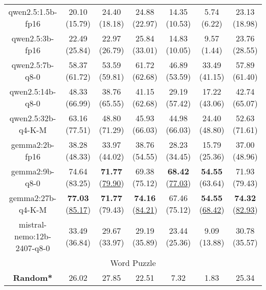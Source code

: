 \begin{table}[hbp]
{\begin{tabular}{ccccccc}
      \multicolumn{1}{c|}{qwen2.5:1.5b-fp16} & 20.10 (15.79) & 24.40 (18.18) & \multicolumn{1}{c|}{24.88 (22.97)} & 14.35 (10.53) & \multicolumn{1}{c|}{5.74 (6.22)} & 23.13 (18.98) \\


      \multicolumn{1}{c|}{qwen2.5:3b-fp16} & 22.49 (25.84) & 22.97 (26.79) & \multicolumn{1}{c|}{25.84 (33.01)} & 14.83 (10.05) & \multicolumn{1}{c|}{9.57 (1.44)} & 23.76 (28.55) \\


      \multicolumn{1}{c|}{qwen2.5:7b-q8-0} & 58.37 (61.72) & 53.59 (59.81) & \multicolumn{1}{c|}{61.72 (62.68)} & 46.89 (53.59) & \multicolumn{1}{c|}{33.49 (41.15)} & 57.89 (61.40) \\


      \multicolumn{1}{c|}{qwen2.5:14b-q8-0} & 48.33 (66.99) & 38.76 (65.55) & \multicolumn{1}{c|}{41.15 (62.68)} & 29.19 (57.42) & \multicolumn{1}{c|}{17.22 (43.06)} & 42.74 (65.07) \\


      \multicolumn{1}{c|}{qwen2.5:32b-q4-K-M} & 63.16 (77.51) & 48.80 (71.29) & \multicolumn{1}{c|}{45.93 (66.03)} & 44.98 (66.03) & \multicolumn{1}{c|}{24.40 (48.80)} & 52.63 (71.61) \\


      \multicolumn{1}{c|}{gemma2:2b-fp16} & 38.28 (48.33) & 33.97 (44.02) & \multicolumn{1}{c|}{38.76 (54.55)} & 28.23 (34.45) & \multicolumn{1}{c|}{15.79 (25.36)} & 37.00 (48.96) \\


      \multicolumn{1}{c|}{gemma2:9b-q8-0} & 74.64 (83.25) & \textbf{71.77} (\underline{79.90}) & \multicolumn{1}{c|}{69.38 (75.12)} & \textbf{68.42} (\underline{77.03}) & \multicolumn{1}{c|}{\textbf{54.55} (63.64)} & 71.93 (79.43) \\


      \multicolumn{1}{c|}{gemma2:27b-q4-K-M} & \textbf{77.03} (\underline{85.17}) & \textbf{71.77} (79.43) & \multicolumn{1}{c|}{\textbf{74.16} (\underline{84.21})} & 67.46 (75.12) & \multicolumn{1}{c|}{\textbf{54.55} (\underline{68.42})} & \textbf{74.32} (\underline{82.93}) \\


      \multicolumn{1}{c|}{mistral-nemo:12b-2407-q8-0} & 33.49 (36.84) & 29.67 (33.97) & \multicolumn{1}{c|}{29.19 (35.89)} & 23.44 (25.36) & \multicolumn{1}{c|}{9.09 (13.88)} & 30.78 (35.57) \\

      \hline
      \multicolumn{7}{c}{Word Puzzle} \\ \hline
      \multicolumn{1}{c|}{\textbf{Random*}} & 26.02 & 27.85 & \multicolumn{1}{c|}{22.51} & 7.32 & \multicolumn{1}{c|}{1.83} & 25.34 \\ \hline


\end{tabular}}
\end{table}
